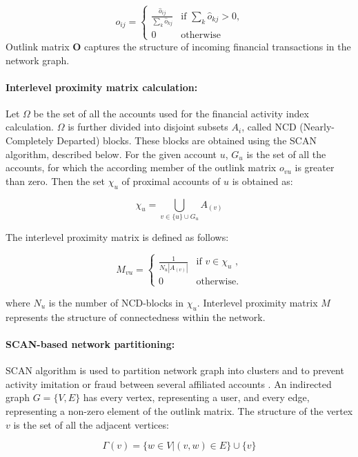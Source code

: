 \documentclass[a4paper,12pt]{article}
\begin{document}
$$
o_{ij} = \begin{cases}
 \frac{\hat{o}_{ij}} {\sum\limits_{k} \hat{o}_{kj}}
 & \text{if $\sum\limits_{k} \hat{o}_{kj}> 0$,}\\
 0 & \text{otherwise}
\end{cases} 
$$
Outlink matrix $\boldsymbol{O}$ captures the structure of incoming financial transactions in the network graph.

\paragraph{Interlevel proximity matrix calculation:}
Let $\Omega$ be the set of all the accounts used for the financial activity index calculation. $\Omega$ is further divided into disjoint subsets $A_i$, called NCD (Nearly-Completely Departed) blocks. These blocks are obtained using the SCAN algorithm, described below. For the given account $u$, $G_u$ is the set of all the accounts, for which the according member of the outlink matrix $o_{vu}$ is greater than zero. Then the set $\chi_u$ of proximal accounts of $u$ is obtained as: 



$$
\chi_u = \bigcup_{v \in \{u\} \cup G_u} A_{(v)}
$$

The interlevel proximity matrix is defined as follows:



$$
M_{vu}=\begin{cases}
 \frac{1}{N_u |A_{(v)}|}
 & \text{if $v \in \chi_u$ ,}\\
 0 & \text{otherwise.}
\end{cases}
$$

where $N_u$ is the number of NCD-blocks in $\chi_u$. Interlevel proximity matrix $M$ represents the structure of connectedness within the network.



\paragraph{SCAN-based network partitioning:}
SCAN algorithm is used to partition network graph into clusters and to prevent activity imitation or fraud between several affiliated accounts \cite{SCAN}. An indirected graph $G = \{V, E\}$ has every vertex, representing a user, and every edge, representing a non-zero element of the outlink matrix. The structure of the vertex $v$ is the set of all the adjacent vertices:


$$
\Gamma(v)=\{w \in V|(v,w) \in E\} \cup \{v\}
$$
\end{document}
